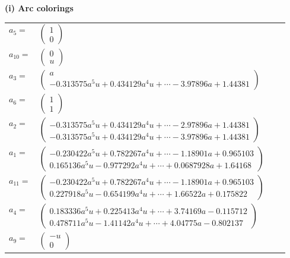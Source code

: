 \documentclass[1p]{elsarticle_modified}
\theoremstyle{definition}
\begin{document}
\flushleft \textbf{(i) Arc colorings}\\
\begin{tabular}{m{7pt} m{180pt} m{7pt} m{180pt} }
\flushright $a_{5}=$&$\begin{pmatrix}1\\0\end{pmatrix}$ \\
\flushright $a_{10}=$&$\begin{pmatrix}0\\u\end{pmatrix}$ \\
\flushright $a_{3}=$&$\begin{pmatrix}a\\-0.313575 a^{5} u+0.434129 a^{4} u+\cdots-3.97896 a+1.44381\end{pmatrix}$ \\
\flushright $a_{6}=$&$\begin{pmatrix}1\\1\end{pmatrix}$ \\
\flushright $a_{2}=$&$\begin{pmatrix}-0.313575 a^{5} u+0.434129 a^{4} u+\cdots-2.97896 a+1.44381\\-0.313575 a^{5} u+0.434129 a^{4} u+\cdots-3.97896 a+1.44381\end{pmatrix}$ \\
\flushright $a_{1}=$&$\begin{pmatrix}-0.230422 a^{5} u+0.782267 a^{4} u+\cdots-1.18901 a+0.965103\\0.165136 a^{5} u-0.977292 a^{4} u+\cdots+0.0687928 a+1.64168\end{pmatrix}$ \\
\flushright $a_{11}=$&$\begin{pmatrix}-0.230422 a^{5} u+0.782267 a^{4} u+\cdots-1.18901 a+0.965103\\0.227918 a^{5} u-0.654199 a^{4} u+\cdots+1.66522 a+0.175822\end{pmatrix}$ \\
\flushright $a_{4}=$&$\begin{pmatrix}0.183336 a^{5} u+0.225413 a^{4} u+\cdots+3.74169 a-0.115712\\0.478711 a^{5} u-1.41142 a^{4} u+\cdots+4.04775 a-0.802137\end{pmatrix}$ \\
\flushright $a_{9}=$&$\begin{pmatrix}- u\\0\end{pmatrix}$ \\

\end{tabular}
\end{document}
